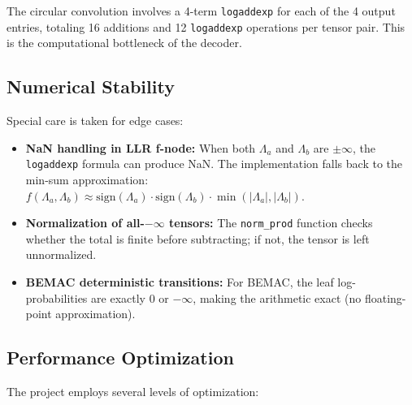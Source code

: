 \documentclass[11pt,a4paper]{article}
\begin{document}
The circular convolution involves a 4-term \texttt{logaddexp} for each of
the 4 output entries, totaling 16 additions and 12 \texttt{logaddexp}
operations per tensor pair. This is the computational bottleneck of the
decoder.

\subsection{Numerical Stability}

Special care is taken for edge cases:
\begin{itemize}
  \item \textbf{NaN handling in LLR f-node:} When both $\Lambda_a$ and
        $\Lambda_b$ are $\pm\infty$, the \texttt{logaddexp} formula can
        produce NaN. The implementation falls back to the min-sum
        approximation: $f(\Lambda_a, \Lambda_b) \approx \text{sign}(\Lambda_a)
        \cdot \text{sign}(\Lambda_b) \cdot \min(|\Lambda_a|, |\Lambda_b|)$.
  \item \textbf{Normalization of all-$-\infty$ tensors:} The
        \texttt{norm\_prod} function checks whether the total is finite
        before subtracting; if not, the tensor is left unnormalized.
  \item \textbf{BEMAC deterministic transitions:} For BEMAC, the leaf
        log-probabilities are exactly $0$ or $-\infty$, making the
        arithmetic exact (no floating-point approximation).
\end{itemize}

\subsection{Performance Optimization}

The project employs several levels of optimization:
\end{document}
